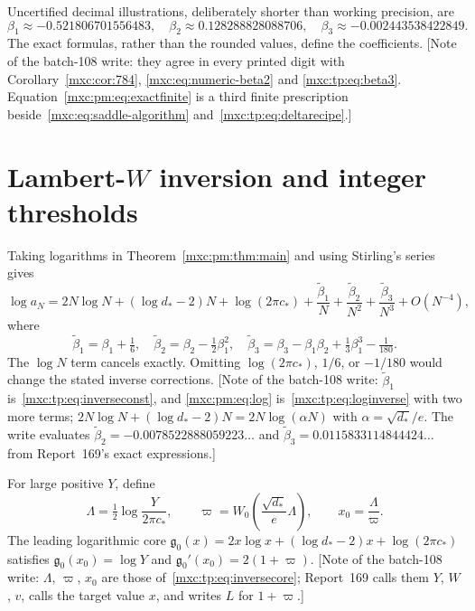 \documentclass[11pt]{article}
\numberwithin{equation}{section}
\theoremstyle{definition}
\theoremstyle{remark}
\begin{document}
Uncertified decimal illustrations, deliberately shorter than working
precision, are
\[
 \beta_1\approx-0.521806701556483,\quad
 \beta_2\approx 0.128288828088706,\quad
 \beta_3\approx-0.002443538422849.
\]
The exact formulas, rather than the rounded values, define the coefficients.
[Note of the batch-108 write: they agree in every printed digit with
Corollary~\ref{mxc:cor:784}, \eqref{mxc:eq:numeric-beta2} and
\eqref{mxc:tp:eq:beta3}. Equation~\eqref{mxc:pm:eq:exactfinite} is a third
finite prescription beside~\eqref{mxc:eq:saddle-algorithm}
and~\eqref{mxc:tp:eq:deltarecipe}.]

\section{Lambert-\texorpdfstring{$W$}{W} inversion and integer thresholds}\label{mxc:pm:sec:inverse}
Taking logarithms in Theorem~\ref{mxc:pm:thm:main} and using Stirling's
series gives
\begin{equation}\label{mxc:pm:eq:log}
 \log a_N=2N\log N+(\log d_*-2)N+\log(2\pi c_*)
             +\frac{\widetilde\beta_1}N+\frac{\widetilde\beta_2}{N^2}
             +\frac{\widetilde\beta_3}{N^3}+O(N^{-4}),
\end{equation}
where
\begin{equation}\label{mxc:pm:eq:h}
 \widetilde\beta_1=\beta_1+\tfrac16,\quad \widetilde\beta_2=\beta_2-\tfrac12\beta_1^2,
 \quad \widetilde\beta_3=\beta_3-\beta_1\beta_2+\tfrac13\beta_1^3-\tfrac1{180}.
\end{equation}
The $\log N$ term cancels exactly. Omitting $\log(2\pi c_*)$, $1/6$, or
$-1/180$ would change the stated inverse corrections. [Note of the batch-108
write: $\widetilde\beta_1$ is~\eqref{mxc:tp:eq:inverseconst}, and
\eqref{mxc:pm:eq:log} is~\eqref{mxc:tp:eq:loginverse} with two more terms;
$2N\log N+(\log d_*-2)N=2N\log(\alpha N)$ with $\alpha=\sqrt{d_*}/e$. The
write evaluates $\widetilde\beta_2=-0.0078522888059223\ldots$ and
$\widetilde\beta_3=0.0115833114844424\ldots$ from Report~169's exact
expressions.]

For large positive $Y$, define
\begin{equation}\label{mxc:pm:eq:Wcore}
 \Lambda=\tfrac12\log\frac{Y}{2\pi c_*},\qquad
 \varpi=W_0\left(\frac{\sqrt{d_*}}{e}\Lambda\right),\qquad
 x_0=\frac\Lambda\varpi.
\end{equation}
The leading logarithmic core
$\mathfrak g_0(x)=2x\log x+(\log d_*-2)x+\log(2\pi c_*)$ satisfies
$\mathfrak g_0(x_0)=\log Y$ and $\mathfrak g_0'(x_0)=2(1+\varpi)$. [Note of
the batch-108 write: $\Lambda$, $\varpi$, $x_0$ are those
of~\eqref{mxc:tp:eq:inversecore}; Report~169 calls them $Y$, $W$, $v$, calls
the target value $x$, and writes $L$ for $1+\varpi$.]
\end{document}
